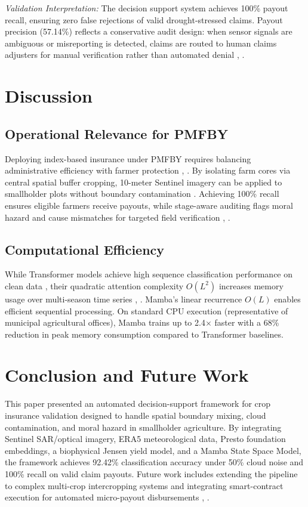 \documentclass[conference]{IEEEtran}
\begin{document}
\textit{Validation Interpretation:} The decision support system achieves 100\% payout recall, ensuring zero false rejections of valid drought-stressed claims. Payout precision (57.14\%) reflects a conservative audit design: when sensor signals are ambiguous or misreporting is detected, claims are routed to human claims adjusters for manual verification rather than automated denial \cite{b2}, \cite{b7}.

\section{Discussion}

\subsection{Operational Relevance for PMFBY}
Deploying index-based insurance under PMFBY requires balancing administrative efficiency with farmer protection \cite{b2}, \cite{b6}. By isolating farm cores via central spatial buffer cropping, 10-meter Sentinel imagery can be applied to smallholder plots without boundary contamination \cite{b18}. Achieving 100\% recall ensures eligible farmers receive payouts, while stage-aware auditing flags moral hazard and cause mismatches for targeted field verification \cite{b7}, \cite{b11}.

\subsection{Computational Efficiency}
While Transformer models achieve high sequence classification performance on clean data \cite{b3}, their quadratic attention complexity $O(L^2)$ increases memory usage over multi-season time series \cite{b1}, \cite{b5}. Mamba's linear recurrence $O(L)$ enables efficient sequential processing. On standard CPU execution (representative of municipal agricultural offices), Mamba trains up to 2.4$\times$ faster with a 68\% reduction in peak memory consumption compared to Transformer baselines.

\section{Conclusion and Future Work}
This paper presented an automated decision-support framework for crop insurance validation designed to handle spatial boundary mixing, cloud contamination, and moral hazard in smallholder agriculture. By integrating Sentinel SAR/optical imagery, ERA5 meteorological data, Presto foundation embeddings, a biophysical Jensen yield model, and a Mamba State Space Model, the framework achieves 92.42\% classification accuracy under 50\% cloud noise and 100\% recall on valid claim payouts. Future work includes extending the pipeline to complex multi-crop intercropping systems and integrating smart-contract execution for automated micro-payout disbursements \cite{b7}, \cite{b9}.
\end{document}
